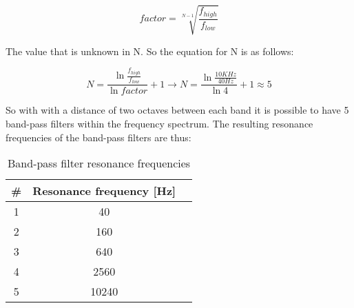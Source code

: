 \begin{equation}
    factor=\sqrt[N-1]{\frac{f_{high}}{f_{low}}}
\end{equation}

The value that is unknown in N. So the equation for N is as follows: 

\begin{equation}
    N=\frac{\ln\frac{f_{high}}{f_{low}}}{\ln{factor}}+1\rightarrow N=\frac{\ln\frac{10KHz}{40Hz}}{\ln{4}}+1\approx 5
\end{equation}

So with with a distance of two octaves between each band it is possible to have 5 band-pass filters within the frequency spectrum. The resulting resonance frequencies of the band-pass filters are thus: 

\begin{table}[h!]
    \centering
    \begin{tabular}{|c|c|c|}
        \hline
        \# & Resonance frequency [Hz]\\
        \hline
        1 & 40\\
        \hline
        2 & 160\\
        \hline
        3 & 640\\
        \hline
        4 & 2560\\
        \hline
        5 & 10240\\
        \hline
    \end{tabular}
    \caption{Band-pass filter resonance frequencies}
    \label{table:bpf-filters-frequencies}
\end{table}



